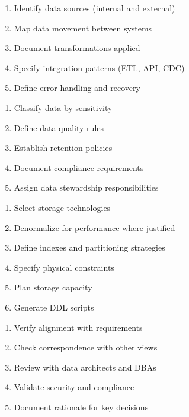 \documentclass[11pt,letterpaper]{article}
\begin{document}
\begin{guidancebox}
\begin{enumerate}[nosep]
    \item Identify data sources (internal and external)
    \item Map data movement between systems
    \item Document transformations applied
    \item Specify integration patterns (ETL, API, CDC)
    \item Define error handling and recovery
\end{enumerate}
\end{guidancebox}

\begin{guidancebox}
\begin{enumerate}[nosep]
    \item Classify data by sensitivity
    \item Define data quality rules
    \item Establish retention policies
    \item Document compliance requirements
    \item Assign data stewardship responsibilities
\end{enumerate}
\end{guidancebox}

\begin{guidancebox}
\begin{enumerate}[nosep]
    \item Select storage technologies
    \item Denormalize for performance where justified
    \item Define indexes and partitioning strategies
    \item Specify physical constraints
    \item Plan storage capacity
    \item Generate DDL scripts
\end{enumerate}
\end{guidancebox}

\begin{guidancebox}
\begin{enumerate}[nosep]
    \item Verify alignment with requirements
    \item Check correspondence with other views
    \item Review with data architects and DBAs
    \item Validate security and compliance
    \item Document rationale for key decisions
\end{enumerate}
\end{guidancebox}
\end{document}
